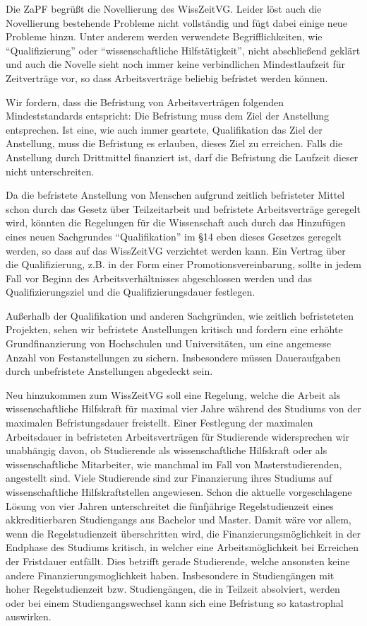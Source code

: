 Die ZaPF begrüßt die Novellierung des WissZeitVG. Leider löst auch die Novellierung bestehende Probleme nicht vollständig und fügt dabei einige neue Probleme hinzu. 
Unter anderem werden verwendete Begrifflichkeiten, wie ``Qualifizierung'' oder  ``wissenschaftliche Hilfstätigkeit'', nicht abschließend geklärt und auch die Novelle sieht noch immer keine verbindlichen Mindestlaufzeit für Zeitverträge vor, so dass Arbeitsverträge beliebig befristet werden können.

Wir fordern, dass die Befristung von Arbeitsverträgen folgenden Mindeststandards entspricht:
Die Befristung muss dem Ziel der Anstellung entsprechen. Ist eine, wie auch immer geartete, Qualifikation das Ziel der Anstellung, muss die Befristung es erlauben, dieses Ziel zu erreichen.
Falls die Anstellung durch Drittmittel finanziert ist, darf die Befristung die Laufzeit dieser nicht unterschreiten.

Da die befristete Anstellung von Menschen aufgrund zeitlich befristeter Mittel schon durch das Gesetz über Teilzeitarbeit und befristete Arbeitsverträge geregelt wird, könnten die Regelungen für die Wissenschaft auch durch das Hinzufügen eines neuen Sachgrundes ``Qualifikation'' im §14 eben dieses Gesetzes geregelt werden, so dass auf das WissZeitVG verzichtet werden kann.
Ein Vertrag über die Qualifizierung, z.B. in der Form einer Promotionsvereinbarung, sollte in jedem Fall vor Beginn des Arbeitsverhältnisses abgeschlossen werden und das Qualifizierungsziel und die Qualifizierungsdauer festlegen.

Außerhalb der Qualifikation und anderen Sachgründen, wie zeitlich befristeteten Projekten, sehen wir befristete Anstellungen kritisch und fordern eine erhöhte Grundfinanzierung von Hochschulen und Universitäten, um eine angemesse Anzahl von Festanstellungen zu sichern. Insbesondere müssen Daueraufgaben durch unbefristete Anstellungen abgedeckt sein.

Neu hinzukommen zum WissZeitVG soll eine Regelung, welche die Arbeit als wissenschaftliche Hilfskraft für maximal vier Jahre während des Studiums von der maximalen Befristungsdauer freistellt.
Einer Festlegung der maximalen Arbeitsdauer in befristeten Arbeitsverträgen für Studierende widersprechen wir unabhängig davon, ob Studierende als wissenschaftliche Hilfskraft oder als wissenschaftliche Mitarbeiter, wie manchmal im Fall von Masterstudierenden, angestellt sind. 
Viele Studierende sind zur Finanzierung ihres Studiums auf wissenschaftliche Hilfskraftstellen angewiesen. Schon die aktuelle vorgeschlagene Lösung von vier Jahren unterschreitet die fünfjährige Regelstudienzeit eines akkreditierbaren Studiengangs aus Bachelor und Master. Damit wäre vor allem, wenn die Regelstudienzeit überschritten wird, die Finanzierungsmöglichkeit in der Endphase des Studiums kritisch, in welcher eine Arbeitsmöglichkeit bei Erreichen der Fristdauer entfällt. Dies betrifft gerade Studierende, welche ansonsten keine andere Finanzierungsmoglichkeit haben. Insbesondere in Studiengängen mit hoher Regelstudienzeit bzw. Studiengängen, die in Teilzeit absolviert, werden oder bei einem Studiengangswechsel kann sich eine Befristung so katastrophal auswirken.

